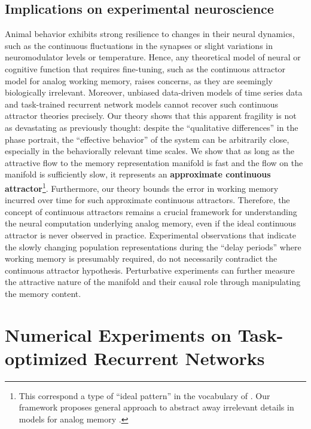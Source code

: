 \documentclass{article} %
\newcounter{ct}
\theoremstyle{definition}
\theoremstyle{remark}
\begin{document}
\subsection{Implications on experimental neuroscience}\label{sec:implications}
Animal behavior exhibits strong resilience to changes in their neural dynamics, such as the continuous fluctuations in the synapses or slight variations in neuromodulator levels or temperature.
Hence, any theoretical model of neural or cognitive function that requires fine-tuning, such as the continuous attractor model for analog working memory, raises concerns, as they are seemingly biologically irrelevant.
Moreover, unbiased data-driven models of time series data and task-trained recurrent network models cannot recover such continuous attractor theories precisely.
Our theory shows that this apparent fragility is not as devastating as previously thought: despite the ``qualitative differences'' in the phase portrait, the ``effective behavior'' of the system can be arbitrarily close, especially in the behaviorally relevant time scales.
We show that as long as the attractive flow to the memory representation manifold is fast and the flow on the manifold is sufficiently slow, it represents an \textbf{approximate continuous attractor}\footnote{This correspond a type of ``ideal pattern'' in the vocabulary of \citet{chirimuuta2024brain}. Our framework proposes general approach to abstract away irrelevant details in models for analog memory \citep{potochnik2017idealization}.}.
Furthermore, our theory bounds the error in working memory incurred over time for such approximate continuous attractors.
Therefore, the concept of continuous attractors remains a crucial framework for understanding the neural computation underlying analog memory, even if the ideal continuous attractor is never observed in practice.
Experimental observations that indicate the slowly changing population representations during the ``delay periods'' where working memory is presumably required, do not necessarily contradict the continuous attractor hypothesis. 
Perturbative experiments can further measure the attractive nature of the manifold and their causal role through manipulating the memory content.



\section{Numerical Experiments on Task-optimized Recurrent Networks}\label{sec:experiments}
\end{document}
